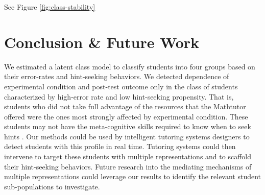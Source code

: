 \documentclass{edm_template}
\begin{document}
See Figure \ref{fig:class-stability}

\section{Conclusion \& Future Work}
\label{sec:conclusion}

We estimated a latent class model to classify students into four groups based on their error-rates and hint-seeking behaviors. We detected dependence of experimental condition and post-test outcome only in the class of students characterized by high-error rate and low hint-seeking propensity. That is, students who did not take full advantage of the resources that the Mathtutor offered were the ones most strongly affected by experimental condition. These students may not have the meta-cognitive skills required to know when to seek hints \cite{Aleven2006}. Our methods could be used by intelligent tutoring systems designers to detect students with this profile in real time. Tutoring systems could then intervene to target these students with multiple representations and to scaffold their hint-seeking behaviors. Future research into  the mediating mechanisms of multiple representations could leverage our results to identify the relevant student sub-populations to investigate. 
\balancecolumns



\end{document}
